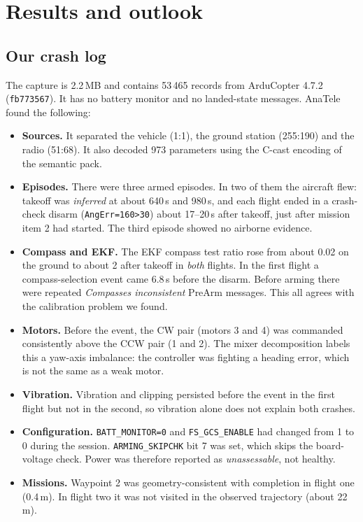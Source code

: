 \documentclass[11pt,a4paper]{article}
\newcommand{\code}[1]{\texttt{#1}}
\begin{document}
\section{Results and outlook}

\subsection{Our crash log}
The capture is 2.2\,MB and contains 53\,465 records from ArduCopter 4.7.2 (\code{fb773567}). It has
no battery monitor and no landed-state messages. AnaTele found the following:

\begin{itemize}
  \item \textbf{Sources.} It separated the vehicle (1:1), the ground station (255:190) and the
        radio (51:68). It also decoded 973 parameters using the C-cast encoding of the semantic
        pack.
  \item \textbf{Episodes.} There were three armed episodes. In two of them the aircraft flew:
        takeoff was \emph{inferred} at about 640\,s and 980\,s, and each flight ended in a
        crash-check disarm (\code{AngErr=160>30}) about 17--20\,s after takeoff, just after
        mission item 2 had started. The third episode showed no airborne evidence.
  \item \textbf{Compass and EKF.} The EKF compass test ratio rose from about 0.02 on the ground
        to about 2 after takeoff in \emph{both} flights. In the first flight a compass-selection
        event came 6.8\,s before the disarm. Before arming there were repeated \emph{Compasses
        inconsistent} PreArm messages. This all agrees with the calibration problem we found.
  \item \textbf{Motors.} Before the event, the CW pair (motors 3 and 4) was commanded
        consistently above the CCW pair (1 and 2). The mixer decomposition labels this a
        yaw-axis imbalance: the controller was fighting a heading error, which is not the same
        as a weak motor.
  \item \textbf{Vibration.} Vibration and clipping persisted before the event in the first flight
        but not in the second, so vibration alone does not explain both crashes.
  \item \textbf{Configuration.} \code{BATT\_MONITOR=0} and \code{FS\_GCS\_ENABLE} had changed from
        1 to 0 during the session. \code{ARMING\_SKIPCHK} bit 7 was set, which skips the
        board-voltage check. Power was therefore reported as \emph{unassessable}, not healthy.
  \item \textbf{Missions.} Waypoint 2 was geometry-consistent with completion in flight one
        (0.4\,m). In flight two it was not visited in the observed trajectory (about 22\,m).
\end{itemize}
\end{document}
